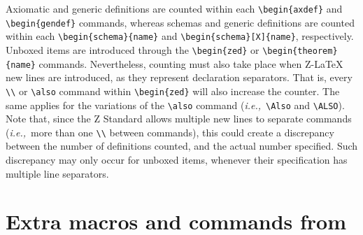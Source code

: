 \documentclass{article}
\begin{document}
Axiomatic and generic definitions are counted within each \verb|\begin{axdef}| and \verb|\begin{gendef}| commands,
whereas schemas and generic definitions are counted within each \verb|\begin{schema}{name}| and 
\verb|\begin{schema}[X]{name}|, respectively. Unboxed items are introduced through the \verb|\begin{zed}| or
\verb|\begin{theorem}{name}| commands. Nevertheless, counting must also take place when Z-\LaTeX{} new lines are introduced, 
as they represent declaration separators. That is, every \verb|\\| or \verb|\also| command within \verb|\begin{zed}| will 
also increase the counter. The same applies for the variations of the \verb|\also| command (\textit{i.e.,}~\verb|\Also| and 
\verb|\ALSO|). Note that, since the Z Standard allows multiple new lines to separate commands (\textit{i.e.,}~more than one 
\verb|\\| between commands), this could create a discrepancy between the number of definitions counted, and the actual number 
specified. Such discrepancy may only occur for unboxed items, whenever their specification has multiple line separators.

\section{Extra macros and commands from \cztstylefile}\label{sec:cztsty}
\end{document}
